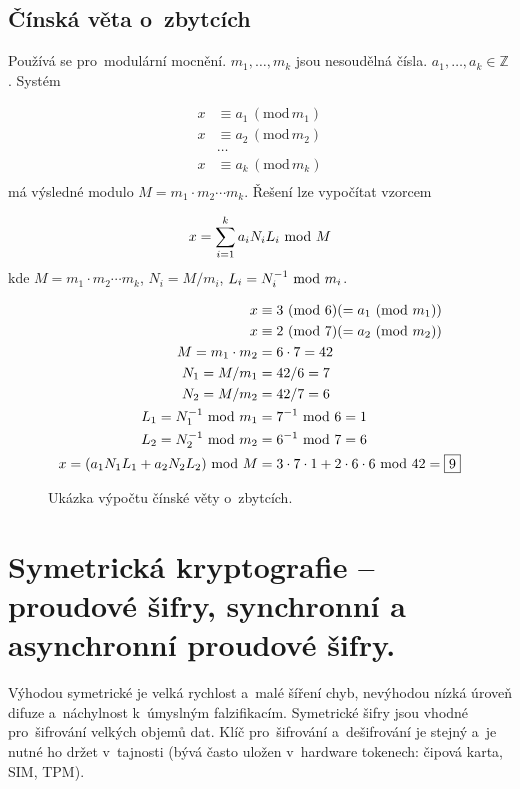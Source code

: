 \clearpage
\subsection{Čínská věta o~zbytcích}

Používá se pro~modulární mocnění. $m_1, \dots, m_k$ jsou nesoudělná čísla. $a_1, \dots, a_k \in \mathbb{Z}$. Systém

\begin{align*}
x &\equiv a_1 \,(\mathrm{mod}\, m_1) \\
x &\equiv a_2 \,(\mathrm{mod}\, m_2) \\
&\dots \\
x &\equiv a_k \,(\mathrm{mod}\, m_k) \\
\end{align*} %
má výsledné modulo $M = m_1 \cdot m_2 \cdots m_k$. Řešení lze vypočítat vzorcem

$$ x = \sum_{i=1}^{k} a_i N_i L_i \ \mathrm{mod}\ M $$
kde $M = m_1 \cdot m_2 \cdots m_k$, $N_i = M / m_i$, $L_i = N_i^{-1} \ \mathrm{mod}\ m_i$.

\begin{figure}[ht]
\centering
\begin{align*}
x &\equiv 3 \ (\mathrm{mod}\ 6) (= a_1 \ (\mathrm{mod}\ m_1)) \\
x &\equiv 2 \ (\mathrm{mod}\ 7) (= a_2 \ (\mathrm{mod}\ m_2)) \\
M = m_1 \cdot m_2 &= 6 \cdot 7 = 42 \\
N_1 = M / m_1 &= 42 / 6 = 7 \\
N_2 = M / m_2 &= 42 / 7 = 6 \\
L_1 = N_1^{-1} \ \mathrm{mod}\ m_1 &= 7^{-1} \ \mathrm{mod}\ 6 = 1 \\
L_2 = N_2^{-1} \ \mathrm{mod}\ m_2 &= 6^{-1} \ \mathrm{mod}\ 7 = 6 \\
x = (a_1 N_1 L_1 + a_2 N_2 L_2) \ \mathrm{mod}\ M &= 3 \cdot 7 \cdot 1 + 2 \cdot 6 \cdot 6 \ \mathrm{mod}\ 42 = \boxed{9} \\
\end{align*}
\vspace*{-4em}
\caption*{Ukázka výpočtu čínské věty o~zbytcích.}
\end{figure}

\clearpage
\section{Symetrická kryptografie -- proudové šifry, synchronní a asynchronní proudové šifry.}
\label{question-4}

Výhodou symetrické je velká rychlost a~malé šíření chyb, nevýhodou nízká úroveň difuze a~náchylnost k~úmyslným falzifikacím. Symetrické šifry jsou vhodné pro~šifrování velkých objemů dat. Klíč pro~šifrování a~dešifrování je stejný a~je nutné ho držet v~tajnosti (bývá často uložen v~hardware tokenech: čipová karta, SIM, TPM).

